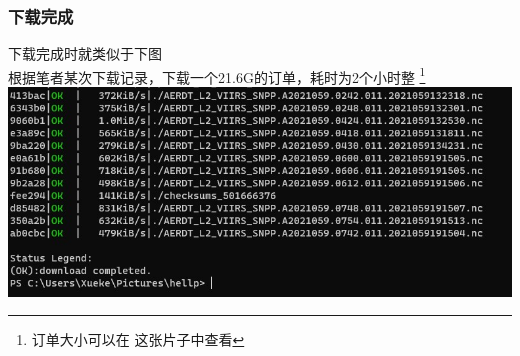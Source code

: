 \begin{frame}
    \frametitle{下载完成}
    下载完成时就类似于下图\\
    根据笔者某次下载记录，下载一个21.6G的订单，耗时为2个小时整
    \footnote{订单大小可以在
    \hyperlink{file-link}{}这张片子中查看}
    \includegraphics[width=\linewidth]{images/d_by_aria2/下载完成.jpg}
\end{frame}